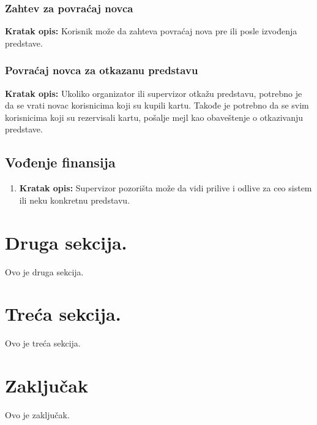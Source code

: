 \documentclass[a4paper]{article}
\begin{document}
\subsubsection{Zahtev za povraćaj novca}  
\noindent\textbf{Kratak opis:} Korisnik može da zahteva povraćaj nova pre ili posle izvođenja predstave.

\subsubsection{Povraćaj novca za otkazanu predstavu}
\noindent\textbf{Kratak opis:} Ukoliko organizator ili supervizor otkažu predstavu, potrebno je
da se vrati novac korisnicima koji su kupili kartu. Takođe je potrebno da se svim korisnicima koji
su rezervisali kartu, pošalje mejl kao obaveštenje o otkazivanju predstave.

\subsection{Vođenje finansija}
\begin{enumerate}
  \item \textbf{Kratak opis:} Supervizor pozorišta može da vidi prilive i odlive za ceo sistem ili
        neku konkretnu predstavu. 
\end{enumerate}

\section{Druga sekcija.}
Ovo je druga sekcija.

\section{Treća sekcija.}
Ovo je treća sekcija.

\section{Zaključak}
Ovo je zaključak.

\newpage

\appendix
 

\end{document}
